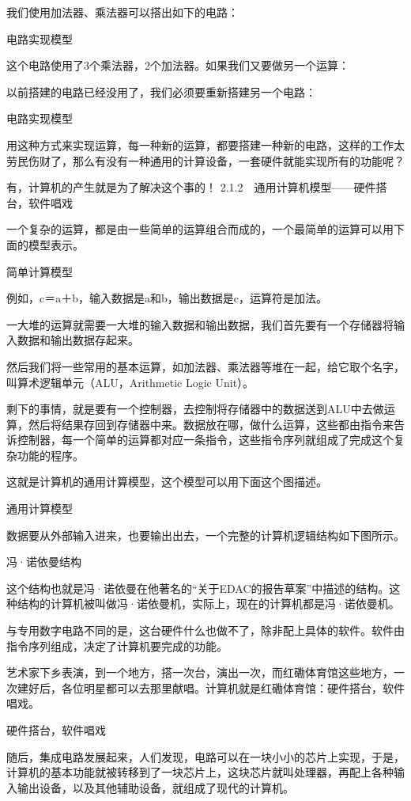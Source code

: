 \documentclass[12pt,UTF8]{ctexbook}
\begin{document}
我们使用加法器、乘法器可以搭出如下的电路：

电路实现模型

这个电路使用了3个乘法器，2个加法器。如果我们又要做另一个运算：

以前搭建的电路已经没用了，我们必须要重新搭建另一个电路：

电路实现模型

用这种方式来实现运算，每一种新的运算，都要搭建一种新的电路，这样的工作太劳民伤财了，那么有没有一种通用的计算设备，一套硬件就能实现所有的功能呢？

有，计算机的产生就是为了解决这个事的！
2.1.2　通用计算机模型——硬件搭台，软件唱戏

一个复杂的运算，都是由一些简单的运算组合而成的，一个最简单的运算可以用下面的模型表示。

简单计算模型

例如，c＝a＋b，输入数据是a和b，输出数据是c，运算符是加法。

一大堆的运算就需要一大堆的输入数据和输出数据，我们首先要有一个存储器将输入数据和输出数据存起来。

然后我们将一些常用的基本运算，如加法器、乘法器等堆在一起，给它取个名字，叫算术逻辑单元（ALU，Arithmetic Logic Unit）。

剩下的事情，就是要有一个控制器，去控制将存储器中的数据送到ALU中去做运算，然后将结果存回到存储器中来。数据放在哪，做什么运算，这些都由指令来告诉控制器，每一个简单的运算都对应一条指令，这些指令序列就组成了完成这个复杂功能的程序。

这就是计算机的通用计算模型，这个模型可以用下面这个图描述。

通用计算模型

数据要从外部输入进来，也要输出出去，一个完整的计算机逻辑结构如下图所示。

冯·诺依曼结构

这个结构也就是冯·诺依曼在他著名的“关于EDAC的报告草案”中描述的结构。这种结构的计算机被叫做冯·诺依曼机，实际上，现在的计算机都是冯·诺依曼机。

与专用数字电路不同的是，这台硬件什么也做不了，除非配上具体的软件。软件由指令序列组成，决定了计算机要完成的功能。

艺术家下乡表演，到一个地方，搭一次台，演出一次，而红磡体育馆这些地方，一次建好后，各位明星都可以去那里献唱。计算机就是红磡体育馆：硬件搭台，软件唱戏。

硬件搭台，软件唱戏

随后，集成电路发展起来，人们发现，电路可以在一块小小的芯片上实现，于是，计算机的基本功能就被转移到了一块芯片上，这块芯片就叫处理器，再配上各种输入输出设备，以及其他辅助设备，就组成了现代的计算机。
\end{document}
